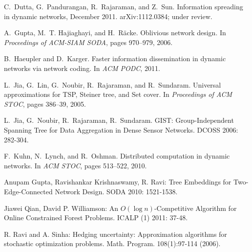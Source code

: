 \documentclass{article}
\begin{document}
{\begin{thebibliography}{99}
C.~Dutta, G.~Pandurangan, R.~Rajaraman, and Z.~Sun.
\newblock Information spreading in dynamic networks, December 2011.
\newblock arXiv:1112.0384; under review.

A.~Gupta, M.~T. Hajiaghayi, and H.~{R\"{a}cke}.
\newblock Oblivious network design.
\newblock In {\em Proceedings of ACM-SIAM SODA}, pages 970--979, 2006.

B.~Haeupler and D.~Karger.
\newblock Faster information dissemination in dynamic networks via network
  coding.
\newblock In {\em ACM PODC}, 2011.

L.~Jia, G.~Lin, G.~Noubir, R.~Rajaraman, and R.~Sundaram.
\newblock Universal approximations for TSP, Steiner tree, and Set cover.
\newblock In {\em Proceedings of ACM STOC}, pages 386--39, 2005.

L.~Jia, G.~Noubir, R.~Rajaraman, R.~Sundaram.
\newblock
GIST: Group-Independent Spanning Tree for Data Aggregation in Dense Sensor Networks.
\newblock DCOSS 2006: 282-304.

F.~Kuhn, N.~Lynch, and R.~Oshman.
\newblock Distributed computation in dynamic networks.
\newblock In {\em ACM STOC}, pages 513--522, 2010.

 Anupam Gupta, Ravishankar Krishnaswamy, R. Ravi: Tree Embeddings for Two-Edge-Connected Network Design. SODA 2010: 1521-1538.

 Jiawei Qian, David P. Williamson: An $O(\log
  n)$-Competitive Algorithm for Online Constrained Forest
  Problems. ICALP (1) 2011: 37-48.

R. Ravi and A. Sinha:   Hedging uncertainty: Approximation
algorithms for stochastic optimization problems. Math. Program. 108(1):97-114 (2006).
\end{thebibliography}

}
\end{document}
